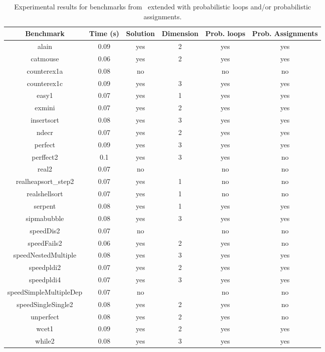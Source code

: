 \begin{center}
\begin{table}[]
  \centering
   \begin{tabular}{c|c|c|c|c|c}
    
   {Benchmark} & {Time (s)} & {Solution} & {Dimension} & {Prob. loops} & {Prob. Assignments
} \\\hline
{alain} & {0.09} & {yes} & {2} & {yes} & {yes
} \\\hline
{catmouse} & {0.06} & {yes} & {2} & {yes} & {yes
} \\\hline
{counterex1a} & {0.08} & {no} & {} & {no} & {no
} \\\hline
{counterex1c} & {0.09} & {yes} & {3} & {yes} & {yes
} \\\hline
{easy1} & {0.07} & {yes} & {1} & {yes} & {yes
} \\\hline
{exmini} & {0.07} & {yes} & {2} & {yes} & {yes
} \\\hline
{insertsort} & {0.08} & {yes} & {3} & {yes} & {yes
} \\\hline
{ndecr} & {0.07} & {yes} & {2} & {yes} & {yes
} \\\hline
{perfect} & {0.09} & {yes} & {3} & {yes} & {yes
} \\\hline
{perffect2} & {0.1} & {yes} & {3} & {yes} & {no
} \\\hline
{real2} & {0.07} & {no} & {} & {no} & {no
} \\\hline
{realheapsort\_step2} & {0.07} & {yes} & {1} & {no} & {no
} \\\hline
{realshellsort} & {0.07} & {yes} & {1} & {no} & {no
} \\\hline
{serpent} & {0.08} & {yes} & {1} & {yes} & {yes
} \\\hline
{sipmabubble} & {0.08} & {yes} & {3} & {yes} & {yes
} \\\hline
{speedDis2} & {0.07} & {no} & {} & {no} & {no
} \\\hline
{speedFails2} & {0.06} & {yes} & {2} & {yes} & {no
} \\\hline
{speedNestedMultiple} & {0.08} & {yes} & {3} & {yes} & {yes
} \\\hline
{speedpldi2} & {0.07} & {yes} & {2} & {yes} & {yes
} \\\hline
{speedpldi4} & {0.07} & {yes} & {3} & {yes} & {yes
} \\\hline
{speedSimpleMultipleDep} & {0.07} & {no} & {} & {no} & {no
} \\\hline
{speedSingleSingle2} & {0.08} & {yes} & {2} & {yes} & {no
} \\\hline
{unperfect} & {0.08} & {yes} & {2} & {yes} & {no
} \\\hline
{wcet1} & {0.09} & {yes} & {2} & {yes} & {yes
} \\\hline
{while2} & {0.08} & {yes} & {3} & {yes} & {yes} \\\hline
    
\end{tabular}
\caption{Experimental results for benchmarks from~\cite{ADFG10:lexicographic} extended with probabilistic loops and/or probabilistic assignments.} \label{tab:exp1}
\end{table}
\end{center}


